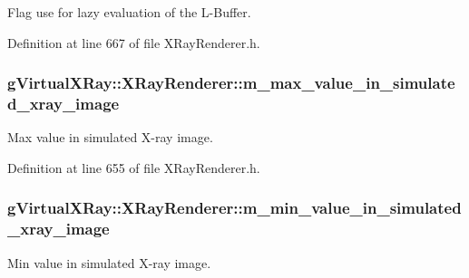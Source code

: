Flag use for lazy evaluation of the L-\/Buffer. 



Definition at line 667 of file XRayRenderer.h.

\hypertarget{classg_virtual_x_ray_1_1_x_ray_renderer_a5e6f1a20a2356390150648719106d4bb}{
\subsubsection[{m\_\-max\_\-value\_\-in\_\-simulated\_\-xray\_\-image}]{ {\bf gVirtualXRay::XRayRenderer::m\_\-max\_\-value\_\-in\_\-simulated\_\-xray\_\-image}}}
\label{classg_virtual_x_ray_1_1_x_ray_renderer_a5e6f1a20a2356390150648719106d4bb}


Max value in simulated X-\/ray image. 



Definition at line 655 of file XRayRenderer.h.

\hypertarget{classg_virtual_x_ray_1_1_x_ray_renderer_a350d7524f24139e16a4beebf16551d52}{
\subsubsection[{m\_\-min\_\-value\_\-in\_\-simulated\_\-xray\_\-image}]{ {\bf gVirtualXRay::XRayRenderer::m\_\-min\_\-value\_\-in\_\-simulated\_\-xray\_\-image}}}
\label{classg_virtual_x_ray_1_1_x_ray_renderer_a350d7524f24139e16a4beebf16551d52}


Min value in simulated X-\/ray image. 



